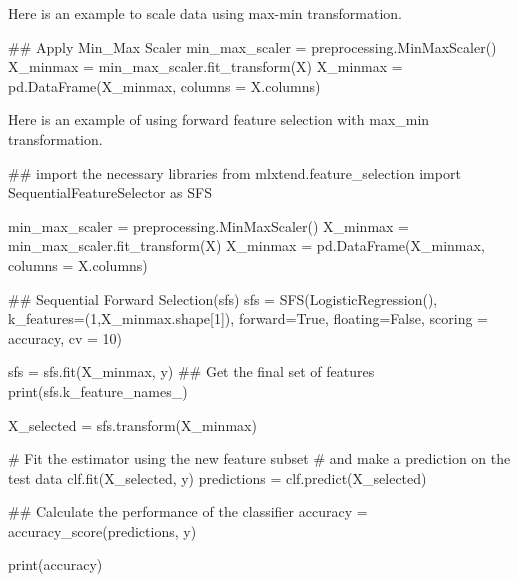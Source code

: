 \documentclass[
  letterpaper,
]{scrbook}
\newenvironment{Shaded}{\begin{snugshade}}{\end{snugshade}}
\newcommand{\BuiltInTok}[1]{\textcolor[rgb]{0.00,0.23,0.31}{#1}}
\newcommand{\CommentTok}[1]{\textcolor[rgb]{0.37,0.37,0.37}{#1}}
\newcommand{\DecValTok}[1]{\textcolor[rgb]{0.68,0.00,0.00}{#1}}
\newcommand{\ImportTok}[1]{\textcolor[rgb]{0.00,0.46,0.62}{#1}}
\newcommand{\NormalTok}[1]{\textcolor[rgb]{0.00,0.23,0.31}{#1}}
\newcommand{\OperatorTok}[1]{\textcolor[rgb]{0.37,0.37,0.37}{#1}}
\newcommand{\StringTok}[1]{\textcolor[rgb]{0.13,0.47,0.30}{#1}}
\newcommand{\VariableTok}[1]{\textcolor[rgb]{0.07,0.07,0.07}{#1}}
\begin{document}
Here is an example to scale data using max-min transformation.

\begin{Shaded}
\begin{Highlighting}[]
\CommentTok{\#\# Apply Min\_Max Scaler}
\NormalTok{min\_max\_scaler }\OperatorTok{=}\NormalTok{ preprocessing.MinMaxScaler()}
\NormalTok{X\_minmax }\OperatorTok{=}\NormalTok{ min\_max\_scaler.fit\_transform(X)}
\NormalTok{X\_minmax }\OperatorTok{=}\NormalTok{ pd.DataFrame(X\_minmax, columns }\OperatorTok{=}\NormalTok{ X.columns)}
\end{Highlighting}
\end{Shaded}

Here is an example of using forward feature selection with max\_min
transformation.

\begin{Shaded}
\begin{Highlighting}[]
\CommentTok{\#\# import the necessary libraries}
\ImportTok{from}\NormalTok{ mlxtend.feature\_selection }\ImportTok{import}\NormalTok{ SequentialFeatureSelector }\ImportTok{as}\NormalTok{ SFS}

\NormalTok{min\_max\_scaler }\OperatorTok{=}\NormalTok{ preprocessing.MinMaxScaler()}
\NormalTok{X\_minmax }\OperatorTok{=}\NormalTok{ min\_max\_scaler.fit\_transform(X)}
\NormalTok{X\_minmax }\OperatorTok{=}\NormalTok{ pd.DataFrame(X\_minmax, columns }\OperatorTok{=}\NormalTok{ X.columns)}

\CommentTok{\#\# Sequential Forward Selection(sfs)}
\NormalTok{sfs }\OperatorTok{=}\NormalTok{ SFS(LogisticRegression(),}
\NormalTok{           k\_features}\OperatorTok{=}\NormalTok{(}\DecValTok{1}\NormalTok{,X\_minmax.shape[}\DecValTok{1}\NormalTok{]),}
\NormalTok{           forward}\OperatorTok{=}\VariableTok{True}\NormalTok{, }
\NormalTok{           floating}\OperatorTok{=}\VariableTok{False}\NormalTok{,}
\NormalTok{           scoring }\OperatorTok{=} \StringTok{\textquotesingle{}accuracy\textquotesingle{}}\NormalTok{,}
\NormalTok{           cv }\OperatorTok{=} \DecValTok{10}\NormalTok{)}

\NormalTok{sfs }\OperatorTok{=}\NormalTok{ sfs.fit(X\_minmax, y)}
\CommentTok{\#\# Get the final set of features}
\BuiltInTok{print}\NormalTok{(sfs.k\_feature\_names\_)}

\NormalTok{X\_selected }\OperatorTok{=}\NormalTok{ sfs.transform(X\_minmax)}

\CommentTok{\# Fit the estimator using the new feature subset}
\CommentTok{\# and make a prediction on the test data}
\NormalTok{clf.fit(X\_selected, y)}
\NormalTok{predictions }\OperatorTok{=}\NormalTok{ clf.predict(X\_selected)}

\CommentTok{\#\# Calculate the performance of the classifier}
\NormalTok{accuracy }\OperatorTok{=}\NormalTok{ accuracy\_score(predictions, y)}

\BuiltInTok{print}\NormalTok{(accuracy)}
\end{Highlighting}
\end{Shaded}
\end{document}
